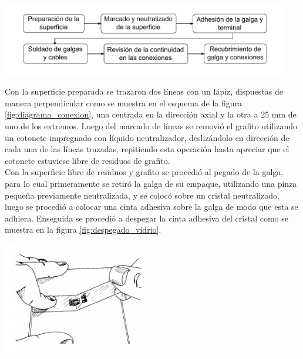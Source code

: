 \begin{center}
\includegraphics[width=0.95\textwidth]{src/ch3/metodologia_instrumentacion.pdf}
\label{fig:metodologia_instrumentacion}
\end{center}

Con la superficie preparada se trazaron dos líneas con un lápiz, dispuestas de manera perpendicular 
como se muestra en el esquema de la figura \ref{fig:diagrama_conexion}, una centrada en 
la dirección axial y la otra a 25 mm de uno de los extremos. Luego del marcado de líneas 
se removió el grafito utilizando un cotonete impregnado con líquido neutralizador, deslizándolo en 
dirección de cada una de las líneas trazadas, repitiendo esta operación hasta apreciar que 
el cotonete estuviese libre de residuos de grafito. \\


Con la superficie libre de residuos y grafito se procedió al pegado de la galga, para lo cual 
primeramente se retiró la galga de su empaque, utilizando una pinza pequeña previamente neutralizada, 
y se colocó sobre un cristal neutralizado, luego se procedió a colocar una cinta adhesiva sobre la 
galga de modo que esta se adhiera. Enseguida se procedió a despegar la cinta adhesiva del cristal  
como se muestra en la figura \ref{fig:despegado_vidrio}.

\begin{center}
\includegraphics[width=0.5\textwidth]{src/ch3/despegado_vidrio.png}
\label{fig:despegado_vidrio}
\end{center}

